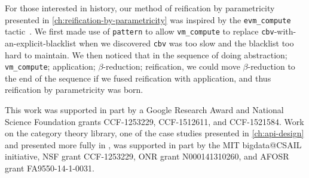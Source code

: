
For those interested in history, our method of reification by parametricity presented in \autoref{ch:reification-by-parametricity} was inspired by the \texttt{evm\_compute} tactic~\cite{MirrorShardITP14}.
We first made use of \texttt{pattern} to allow \texttt{vm\_compute} to replace \texttt{cbv}-with-an-explicit-blacklist when we discovered \texttt{cbv} was too slow and the blacklist too hard to maintain.
We then noticed that in the sequence of doing abstraction; \texttt{vm\_compute}; application; $\beta$-reduction; reification, we could move $\beta$-reduction to the end of the sequence if we fused reification with application, and thus reification by parametricity was born.

This work was supported in part by a Google Research Award and National Science Foundation grants CCF-1253229, CCF-1512611, and CCF-1521584.
Work on the category theory library, one of the case studies presented in \autoref{ch:api-design} and presented more fully in , was supported in part by the MIT bigdata@CSAIL initiative, NSF grant CCF-1253229, ONR grant N000141310260, and AFOSR grant FA9550-14-1-0031.

